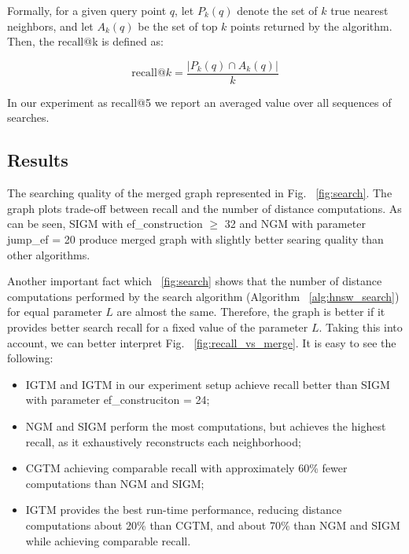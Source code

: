 \documentclass{article}
\begin{document}
Formally, for a given query point \(q\), let \(P_k(q)\) denote the set of \(k\) true nearest neighbors, and let \(A_k(q)\) be the set of top \(k\) points returned by the algorithm. Then, the recall@k is defined as:

\[
\text{recall@}k = \frac{|P_k(q) \cap A_k(q)|}{k}
\]

In our experiment as recall@5 we report an averaged value over all sequences of searches. 

\subsection{Results}

The searching quality of the merged graph represented in Fig. ~\ref{fig:search}. The graph plots trade-off between recall and the number of distance computations. As can be seen, \textsc{SIGM} with ef\_construction $\ge$ 32 and \textsc{NGM} with parameter jump\_ef = 20 produce merged graph with slightly better searing quality than other algorithms.

Another important fact which ~\ref{fig:search} shows that the number of distance computations performed by the search algorithm (Algorithm ~\ref{alg:hnsw_search}) for equal parameter $L$ are almost the same.  Therefore, the graph is better if it provides better search recall for a fixed value of the parameter $L$. Taking this into account, we can better interpret Fig. ~\ref{fig:recall_vs_merge}. It is easy to see the following:  

\begin{itemize}
    \item\textsc{IGTM} and \textsc{IGTM}  in our experiment setup  achieve recall better than \textsc{SIGM} with parameter ef\_construciton = 24;
    \item \textsc{NGM} and \textsc{SIGM} perform the most computations, but achieves the highest recall, as it exhaustively reconstructs each neighborhood;
    \item \textsc{CGTM} achieving comparable recall with approximately 60\% fewer computations than \textsc{NGM} and \textsc{SIGM};
    \item \textsc{IGTM} provides the best run-time performance, reducing distance computations about 20\% than \textsc{CGTM}, and about 70\% than \textsc{NGM} and \textsc{SIGM} while achieving comparable recall.
\end{itemize}
\end{document}
